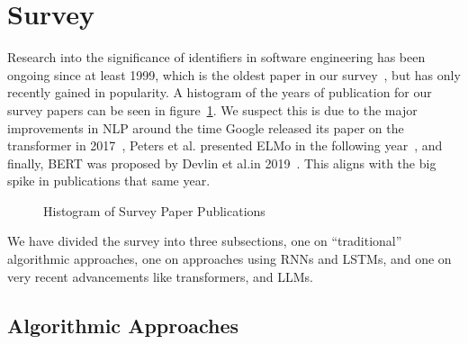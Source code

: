 \documentclass[conference]{IEEEtran}
\begin{document}
\section{Survey}
\label{sec:Survey}

Research into the significance of identifiers in software engineering has been ongoing
since at least 1999, which is the oldest paper in our survey~\cite{Antoniol1999OO}, but
has only recently gained in popularity. A histogram of the years of publication for our
survey papers can be seen in figure~\ref{fig:Histogram-of-Survey-Paper-Publications}. We
suspect this is due to the major improvements in \ac{NLP} around the time Google released
its paper on the transformer in 2017~\cite{Ashish2017Transformer}, Peters et al.\@
presented ELMo in the following year~\cite{Peters2018DeepCW}, and finally, BERT was
proposed by Devlin et al.\@ in 2019~\cite{Devlin2019BERT}. This aligns with the big spike
in publications that same year.

\begin{figure}[h!]
    \caption{Histogram of Survey Paper Publications}
    \label{fig:Histogram-of-Survey-Paper-Publications}
\end{figure}

We have divided the survey into three subsections, one on \enquote{traditional}
algorithmic approaches, one on approaches using \acp{RNN} and \acp{LSTM}, and one on very
recent advancements like transformers, and \acp{LLM}.

\subsection{Algorithmic Approaches}
\label{ssec:Algorithmic-Approaches}
\end{document}
